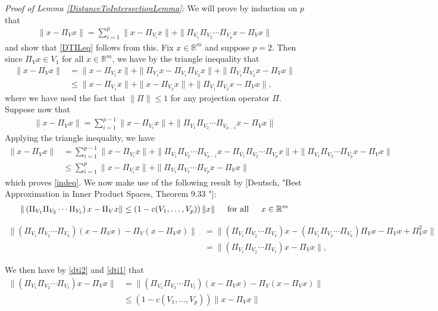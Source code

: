 \documentclass[journal,onecolumn]{IEEEtran}
\begin{document}
\emph{Proof of Lemma \ref{DistanceToIntersectionLemma}:} We will prove by induction on $p$ that
\begin{align}\label{indeq}
\|x-\Pi_V x\| = \sum_{i=1}^p \|x - \Pi_{V_i} x\| + \|\Pi_{V_1}\Pi_{V_2}\cdots\Pi_{V_p} x - \Pi_V x\|
\end{align}
%
and show that \eqref{DTILeq} follows from this. Fix $x \in \mathbb{R}^m$ and suppose $p=2$. Then since $\Pi_Vx \in V_1$ for all $x \in \mathbb{R}^m$, we have by the triangle inequality that
\begin{align}
\|x - \Pi_Vx\| &= \|x - \Pi_{V_1} x\| + \|\Pi_{V_1}x - \Pi_{V_1}\Pi_{V_2} x\| + \|\Pi_{V_1}\Pi_{V_2}x - \Pi_Vx\| \\
&\leq \|x - \Pi_{V_1} x\| + \|x - \Pi_{V_2}x\| + \|\Pi_{V_1}\Pi_{V_2}x - \Pi_Vx\|,
\end{align}
%
where we have used the fact that $\|\Pi\| \leq 1$ for any projection operator $\Pi$. Suppose now that
\begin{align}
\|x-\Pi_V x\| = \sum_{i=1}^{p-1} \|x - \Pi_{V_i} x\| + \|\Pi_{V_1}\Pi_{V_2}\cdots\Pi_{V_{p-1}} x - \Pi_V x\|
\end{align}
Applying the triangle inequality, we have
\begin{align}
\|x-\Pi_V x\| &= \sum_{i=1}^{p-1} \|x - \Pi_{V_i} x\| + \|\Pi_{V_1}\Pi_{V_2}\cdots\Pi_{V_{p-1}} x - \Pi_{V_1}\Pi_{V_2}\cdots\Pi_{V_p}  x\| + \|\Pi_{V_1}\Pi_{V_2}\cdots\Pi_{V_p} x - \Pi_V x\| \\
&\leq \sum_{i=1}^p \|x - \Pi_{V_i} x\| + \|\Pi_{V_1}\Pi_{V_2}\cdots\Pi_{V_p} x - \Pi_V x\|
\end{align}
%
which proves \eqref{indeq}. We now make use of the following result by [Deutsch, "Best Approximation in Inner Product Spaces, Theorem 9.33 "]:
\begin{align}\label{dti2}
\|\left(\Pi_{V_1}\Pi_{V_2}\cdots\Pi_{V_\ell}\right)x - \Pi_Vx\| \leq \left( 1-c(V_1, \ldots, V_p) \right) \|x\| \indent \text{for all} \indent x \in \mathbb{R}^m
\end{align}
%

\begin{align}\label{dti1}
\|(\Pi_{V_1}\Pi_{V_2}\cdots\Pi_{V_k})(x - \Pi_Vx) - \Pi_V(x - \Pi_Vx)\| 
&= \| (\Pi_{V_1}\Pi_{V_2}\cdots\Pi_{V_k}) x - (\Pi_{V_1}\Pi_{V_2}\cdots\Pi_{V_k}) \Pi_V x - \Pi_V x + \Pi_V^2 x \| \nonumber \\
&= \|(\Pi_{V_1}\Pi_{V_2}\cdots\Pi_{V_\ell}) x - \Pi_V x \|,
\end{align}

We then have by \eqref{dti2} and \eqref{dti1} that
\begin{align*}
\|(\Pi_{V_1}\Pi_{V_2}\cdots\Pi_{V_\ell}) x - \Pi_V x \| 
&= \|(\Pi_{V_1}\Pi_{V_2}\cdots\Pi_{V_\ell})(x - \Pi_Vx) - \Pi_V(x - \Pi_Vx)\| \\
&\leq (1-c(V_1, \ldots, V_p) ) \|x - \Pi_Vx\|
\end{align*}
\end{document}
